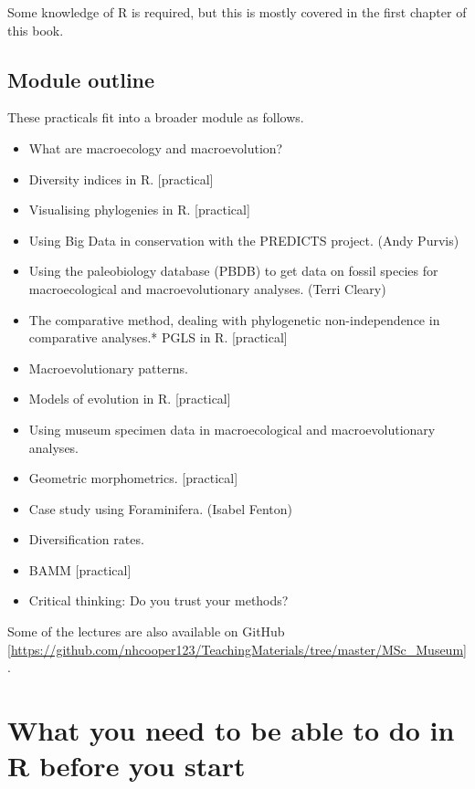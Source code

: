 \documentclass[]{book}
\providecommand{\tightlist}{%
  \setlength{\itemsep}{0pt}\setlength{\parskip}{0pt}}
\begin{document}
Some knowledge of R is required, but this is mostly covered in the first
chapter of this book.

\section{Module outline}\label{module-outline}

These practicals fit into a broader module as follows.

\begin{itemize}
\tightlist
\item
  What are macroecology and macroevolution?
\item
  Diversity indices in R. {[}practical{]}
\item
  Visualising phylogenies in R. {[}practical{]}
\item
  Using Big Data in conservation with the PREDICTS project. (Andy
  Purvis)
\item
  Using the paleobiology database (PBDB) to get data on fossil species
  for macroecological and macroevolutionary analyses. (Terri Cleary)
\item
  The comparative method, dealing with phylogenetic non-independence in
  comparative analyses.* PGLS in R. {[}practical{]}
\item
  Macroevolutionary patterns.
\item
  Models of evolution in R. {[}practical{]}
\item
  Using museum specimen data in macroecological and macroevolutionary
  analyses.
\item
  Geometric morphometrics. {[}practical{]}
\item
  Case study using Foraminifera. (Isabel Fenton)
\item
  Diversification rates.
\item
  BAMM {[}practical{]}
\item
  Critical thinking: Do you trust your methods?
\end{itemize}

Some of the lectures are also available on GitHub
{[}\url{https://github.com/nhcooper123/TeachingMaterials/tree/master/MSc_Museum}{]}.

\chapter{What you need to be able to do in R before you
start}\label{what-you-need-to-be-able-to-do-in-r-before-you-start}
\end{document}
